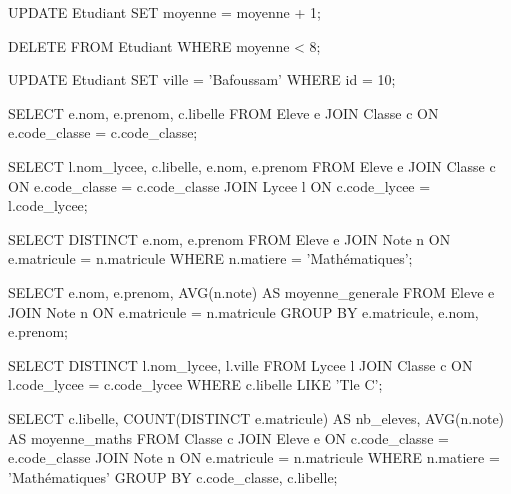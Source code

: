 \begin{sqlcode}
UPDATE Etudiant
SET moyenne = moyenne + 1;
\end{sqlcode}

\begin{sqlcode}
DELETE FROM Etudiant
WHERE moyenne < 8;
\end{sqlcode}

\begin{sqlcode}
UPDATE Etudiant
SET ville = 'Bafoussam'
WHERE id = 10;
\end{sqlcode}

\begin{sqlcode}
SELECT e.nom, e.prenom, c.libelle
FROM Eleve e
JOIN Classe c ON e.code_classe = c.code_classe;
\end{sqlcode}

\begin{sqlcode}
SELECT l.nom_lycee, c.libelle, e.nom, e.prenom
FROM Eleve e
JOIN Classe c ON e.code_classe = c.code_classe
JOIN Lycee l ON c.code_lycee = l.code_lycee;
\end{sqlcode}

\begin{sqlcode}
SELECT DISTINCT e.nom, e.prenom
FROM Eleve e
JOIN Note n ON e.matricule = n.matricule
WHERE n.matiere = 'Mathématiques';
\end{sqlcode}

\begin{sqlcode}
SELECT e.nom, e.prenom, AVG(n.note) AS moyenne_generale
FROM Eleve e
JOIN Note n ON e.matricule = n.matricule
GROUP BY e.matricule, e.nom, e.prenom;
\end{sqlcode}

\begin{sqlcode}
SELECT DISTINCT l.nom_lycee, l.ville
FROM Lycee l
JOIN Classe c ON l.code_lycee = c.code_lycee
WHERE c.libelle LIKE 'Tle C';
\end{sqlcode}

\begin{sqlcode}
SELECT c.libelle, COUNT(DISTINCT e.matricule) AS nb_eleves,
       AVG(n.note) AS moyenne_maths
FROM Classe c
JOIN Eleve e ON c.code_classe = e.code_classe
JOIN Note n ON e.matricule = n.matricule
WHERE n.matiere = 'Mathématiques'
GROUP BY c.code_classe, c.libelle;
\end{sqlcode}


